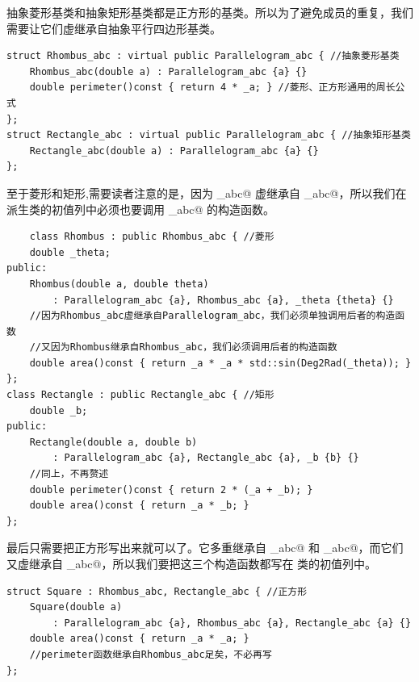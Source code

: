 抽象菱形基类和抽象矩形基类都是正方形的基类。所以为了避免成员的重复，我们需要让它们虚继承自抽象平行四边形基类。
\begin{lstlisting}
struct Rhombus_abc : virtual public Parallelogram_abc { //抽象菱形基类
    Rhombus_abc(double a) : Parallelogram_abc {a} {}
    double perimeter()const { return 4 * _a; } //菱形、正方形通用的周长公式
};
struct Rectangle_abc : virtual public Parallelogram_abc { //抽象矩形基类
    Rectangle_abc(double a) : Parallelogram_abc {a} {}
};
\end{lstlisting}\par
至于菱形和矩形,需要读者注意的是，因为 \lstinline@Rhombus_abc@ 虚继承自 \lstinline@Parallelogram_abc@，所以我们在 \lstinline@Rhombus@ 派生类的初值列中必须也要调用 \lstinline@Parallelogram_abc@ 的构造函数。
\begin{lstlisting}
    class Rhombus : public Rhombus_abc { //菱形
    double _theta;
public:
    Rhombus(double a, double theta)
        : Parallelogram_abc {a}, Rhombus_abc {a}, _theta {theta} {}
    //因为Rhombus_abc虚继承自Parallelogram_abc，我们必须单独调用后者的构造函数
    //又因为Rhombus继承自Rhombus_abc，我们必须调用后者的构造函数
    double area()const { return _a * _a * std::sin(Deg2Rad(_theta)); }
};
class Rectangle : public Rectangle_abc { //矩形
    double _b;
public:
    Rectangle(double a, double b)
        : Parallelogram_abc {a}, Rectangle_abc {a}, _b {b} {}
    //同上，不再赘述
    double perimeter()const { return 2 * (_a + _b); }
    double area()const { return _a * _b; }
};
\end{lstlisting}\par
最后只需要把正方形写出来就可以了。它多重继承自 \lstinline@Rhombus_abc@ 和 \lstinline@Rectangle_abc@，而它们又虚继承自 \lstinline@Parallelogram_abc@，所以我们要把这三个构造函数都写在 \lstinline@Square@ 类的初值列中。
\begin{lstlisting}
struct Square : Rhombus_abc, Rectangle_abc { //正方形
    Square(double a)
        : Parallelogram_abc {a}, Rhombus_abc {a}, Rectangle_abc {a} {}
    double area()const { return _a * _a; }
    //perimeter函数继承自Rhombus_abc足矣，不必再写
};
\end{lstlisting}\par
